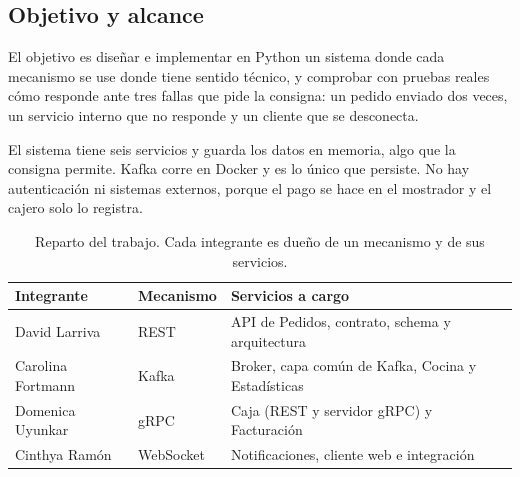 \subsection{Objetivo y alcance}

El objetivo es diseñar e implementar en Python un sistema donde cada mecanismo se use donde tiene sentido técnico, y comprobar con pruebas reales cómo responde ante tres fallas que pide la consigna: un pedido enviado dos veces, un servicio interno que no responde y un cliente que se desconecta.

El sistema tiene seis servicios y guarda los datos en memoria, algo que la consigna permite. Kafka corre en Docker y es lo único que persiste. No hay autenticación ni sistemas externos, porque el pago se hace en el mostrador y el cajero solo lo registra.

\begin{table}[H]
\centering
\small
\begin{tabularx}{\textwidth}{@{}l l Y@{}}
\toprule
\textbf{Integrante} & \textbf{Mecanismo} & \textbf{Servicios a cargo} \\
\midrule
David Larriva & REST & API de Pedidos, contrato, schema y arquitectura \\
Carolina Fortmann & Kafka & Broker, capa común de Kafka, Cocina y Estadísticas \\
Domenica Uyunkar & gRPC & Caja (REST y servidor gRPC) y Facturación \\
Cinthya Ramón & WebSocket & Notificaciones, cliente web e integración \\
\bottomrule
\end{tabularx}
\caption{Reparto del trabajo. Cada integrante es dueño de un mecanismo y de sus servicios.}
\label{tab:equipo}
\end{table}
